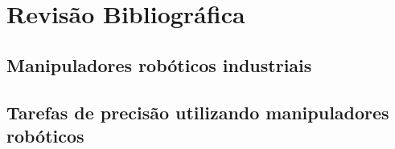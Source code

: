 \chapter{Revisão Bibliográfica}

% 

\section{Manipuladores robóticos industriais}\label{sec::manind}


\section{Tarefas de precisão utilizando manipuladores robóticos}

